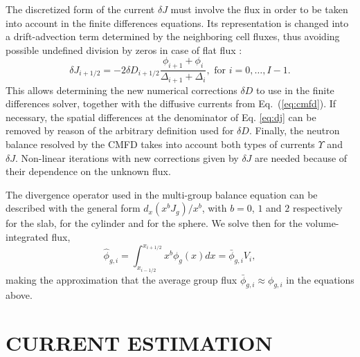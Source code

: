 \documentclass{ictt26}
\newcommand{\eq}[1]{Eq.~(\ref{#1})}
\begin{document}
%
The discretized form of the current $\delta J$ must involve the flux in order to be taken into account in the finite differences equations. Its representation is changed into a drift-advection term determined by the neighboring cell fluxes, thus avoiding possible undefined division by zeros in case of flat flux \cite{smith1983nodal}:
\begin{equation}
  \delta J_{i+1/2} = -2 \delta D_{i+1/2} \frac{\phi_{i+1} + \phi_{i}}{\Delta_{i+1} + \Delta_{i}}, \text{ for } i = 0, \ldots, I-1.
  \label{eq:dj}
\end{equation}
This allows determining the new numerical corrections $\delta D$ to use in the finite differences solver, together with the diffusive currents from \eq{eq:cmfd}. If necessary, the spatial differences at the denominator of Eq. \ref{eq:dj} can be removed by reason of the arbitrary definition used for $\delta D$. Finally, the neutron balance resolved by the CMFD takes into account both types of currents $\Upsilon$ and $\delta J$. Non-linear iterations with new corrections given by $\delta J$ are needed because of their dependence on the unknown flux.

The divergence operator used in the multi-group balance equation can be described with the general form $d_x (x^b J_g)/ x^b$, with $b = 0$, $1$ and $2$ respectively for the slab, for the cylinder and for the sphere. We solve then for the volume-integrated flux,
\begin{equation*}
  \hat{\phi}_{g,i} = \int_{x_{i-1/2}}^{x_{i+1/2}}{ x^b \phi_g(x) dx } = \bar{\phi}_{g,i} V_i,
\end{equation*}
making the approximation that the average group flux $\bar{\phi}_{g,i} \approx \phi_{g,i}$ in the equations above.


\section{CURRENT ESTIMATION}
\label{sec:ce}
\end{document}
